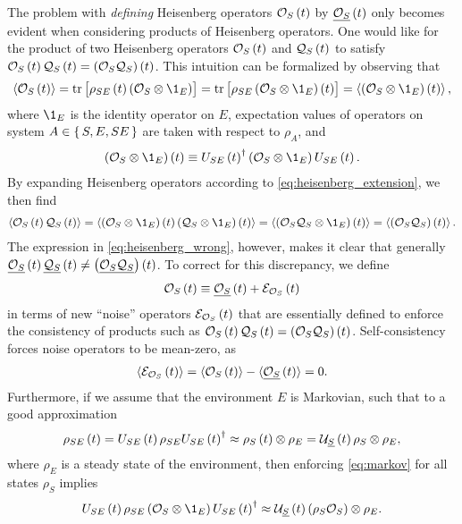 The problem with {\it defining} Heisenberg operators $\mathcal{O}_S\left( t \right)$ by
$\underline{\mathcal{O}_S}\left( t \right)$ only becomes evident when considering products of
Heisenberg operators.  One would like for the product of two
Heisenberg operators $\mathcal{O}_S\left( t \right)$ and $\mathcal{Q}_S\left( t \right)$ to satisfy
$\mathcal{O}_S\left( t \right)\mathcal{Q}_S\left( t \right)=\left( \mathcal{O}_S\mathcal{Q}_S \right)\left( t \right)$.  This intuition can be
formalized by observing that
\begin{align}
  \bk{\O_S\p{t}}
  = \tr\sp{\rho_{SE}\p{t} \p{\O_S\otimes\1_E}}
  = \tr\sp{\rho_{SE} \p{\O_S\otimes\1_E}\p{t}}
  = \bk{\p{\O_S\otimes\1_E}\p{t}},
\end{align}
where $\1_E$ is the identity operator on $E$, expectation values of
operators on system $A\in\set{S,E,SE}$ are taken with respect to
$\rho_A$, and
\begin{align}
  \p{\O_S\otimes\1_E}\p{t}
  \equiv U_{SE}\p{t}^\dag \p{\O_S\otimes\1_E} U_{SE}\p{t}.
  \label{eq:heisenberg_extension}
\end{align}
By expanding Heisenberg operators according to
\eqref{eq:heisenberg_extension}, we then find
\begin{align}
  \bk{\O_S\p{t}\Q_S\p{t}}
  = \bk{\p{\O_S\otimes\1_E}\p{t} \p{\Q_S\otimes\1_E}\p{t}}
  = \bk{\p{\O_S\Q_S\otimes\1_E}\p{t}}
  = \bk{\p{\O_S\Q_S}\p{t}}.
\end{align}
The expression in \eqref{eq:heisenberg_wrong}, however, makes it clear
that generally
$\underline{\mathcal{O}_S}\left( t \right) \underline{\mathcal{Q}_S}\left( t \right)\ne\left( \underline{\mathcal{O}_S\mathcal{Q}_S} \right)\left( t \right)$.  To correct
for this discrepancy, we define
\begin{align}
  \mathcal{O}_S\left( t \right) \equiv \underline{\mathcal{O}_S}\left( t \right) + \mathcal{E}_{\mathcal{O}_S}\left( t \right)
  \label{eq:noise_def}
\end{align}
in terms of new ``noise'' operators $\mathcal{E}_{\mathcal{O}_S}\left( t \right)$ that are
essentially defined to enforce the consistency of products such as
$\mathcal{O}_S\left( t \right)\mathcal{Q}_S\left( t \right)=\left( \mathcal{O}_S\mathcal{Q}_S \right)\left( t \right)$.  Self-consistency forces noise
operators to be mean-zero, as
\begin{align}
  \braket{\mathcal{E}_{\mathcal{O}_S}\left( t \right)} = \braket{\mathcal{O}_S\left( t \right)} - \braket{\underline{\mathcal{O}_S}\left( t \right)} = 0.
\end{align}
Furthermore, if we assume that the environment $E$ is Markovian, such
that to a good approximation
\begin{align}
  \rho_{SE}\left( t \right) = U_{SE}\left( t \right) \rho_{SE} U_{SE}\left( t \right)^\dag
  \approx \rho_S\left( t \right)\otimes\rho_E
  = \mathcal{U}_{\underline S}\left( t \right) \rho_S\otimes\rho_E,
  \label{eq:markov}
\end{align}
where $\rho_E$ is a steady state of the environment, then enforcing
\eqref{eq:markov} for all states $\rho_S$ implies
\begin{align}
  U_{SE}\p{t} \rho_{SE} \p{\O_S\otimes\1_E} U_{SE}\p{t}^\dag
  \approx \U_{\ul S}\p{t}\p{\rho_S\O_S}\otimes\rho_E.
  \label{eq:makov_op}
\end{align}
